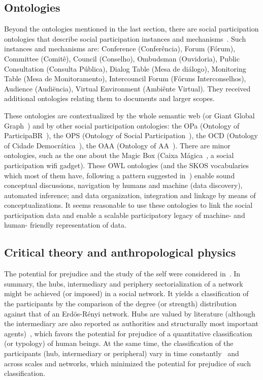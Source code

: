 \documentclass[letterpaper,10pt]{article}
\begin{document}
\subsection{Ontologies}\label{ont}
Beyond the ontologies mentioned in the last section,
there are social participation ontologies that describe
social participation instances and mechanisms~\cite{p5}.
Such instances and mechanisms are:
Conference (Conferência), Forum (Fórum),
Committee (Comitê), Council (Conselho), Ombudsman (Ouvidoria),
Public Consultation (Consulta Pública), Dialog Table (Mesa de diálogo),
Monitoring Table (Mesa de Monitoramento), Intercouncil Forum (Fóruns Interconselhos),
Audience (Audiëncia),
Virtual Environment (Ambiênte Virtual).
They received additional ontologies relating them to documents and
larger scopes.

These ontologies are contextualized by the whole semantic web
(or Giant Global Graph~\cite{losd})
and by other social participation ontologies:
the OPa (Ontology of ParticipaBR~\cite{p5}), the OPS (Ontology of Social Participation~\cite{ops}),
the OCD (Ontology of Cidade Democrática~\cite{p5}), the OAA (Ontology of AA~\cite{p5}).
There are minor ontologies, such as the one about the Magic Box (Caixa Mágica~\cite{cm},
a social participation wifi gadget).
These OWL ontologies (and the SKOS vocabularies which most of them have, following
a pattern suggested in~\cite{ont}) enable
sound conceptual discussions, navigation by humans and machine (data discovery),
 automated inference; and data organization, integration and linkage by means of conceptualizations.
It seems reasonable to use these ontologies to link the social participation data
and enable a scalable participatory legacy of machine- and human- friendly representation
of data.

\subsection{Critical theory and anthropological physics}\label{exp}
The potential for prejudice and the study of the self
were considered in~\cite{imp,stab,tese}.
In summary, the hubs, intermediary and periphery sectorialization
of a network might be achieved (or imposed) in a social network.
It yields a classification of the participants
by the comparison of the degree (or strength) distribution
against that of an Erdös-Rényi network.
Hubs are valued by literature
(although the intermediary are also reported as authorities
and structurally most important agents)~\cite{ega},
which favors the potential for prejudice
of a quantitative classification (or typology)
of human beings.
At the same time, the classification of the participants
(hub, intermediary or peripheral)
vary in time constantly~\cite{stab,tese}
and across scales and networks,
which minimized the potential
for prejudice of such classification.
\end{document}
